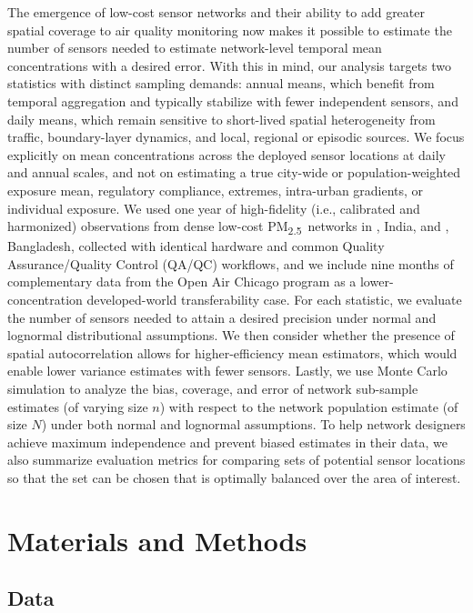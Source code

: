 \documentclass[12pt]{article}
\theoremstyle{remark}
\newcommand{\pmtt}{\textrm{PM\textsubscript{2.5}}}
\newcommand{\city}[1]{\capitalisewords{\MakeLowercase{#1}}}
\begin{document}
The emergence of low-cost sensor networks and their ability to add greater spatial coverage to air quality monitoring now makes it possible to estimate the number of sensors needed to estimate network-level temporal mean concentrations with a desired error. With this in mind, our analysis targets two statistics with distinct sampling demands: annual means, which benefit from temporal aggregation and typically stabilize with fewer independent sensors, and daily means, which remain sensitive to short-lived spatial heterogeneity from traffic, boundary-layer dynamics, and local, regional or episodic sources. We focus explicitly on mean concentrations across the deployed sensor locations at daily and annual scales, and not on estimating a true city-wide or population-weighted exposure mean, regulatory compliance, extremes, intra-urban gradients, or individual exposure. We used one year of high-fidelity (i.e., calibrated and harmonized) observations from dense low-cost \pmtt\ networks in \city{Lucknow}, India, and \city{Dhaka}, Bangladesh, collected with identical hardware and common Quality Assurance/Quality Control (QA/QC) workflows,\supercite{tsi_bluesky_2020,madhwal_evaluation_2024,jain_hybrid_2024,zaman_comparison_2025,saeed_sustaining_2025} and we include nine months of complementary data from the Open Air Chicago program as a lower-concentration developed-world transferability case. For each statistic, we evaluate the number of sensors needed to attain a desired precision under normal and lognormal distributional assumptions. We then consider whether the presence of spatial autocorrelation allows for higher-efficiency mean estimators, which would enable lower variance estimates with fewer sensors. Lastly, we use Monte Carlo simulation to analyze the bias, coverage, and error of network sub-sample estimates (of varying size $n$) with respect to the network population estimate (of size $N$) under both normal and lognormal assumptions. To help network designers achieve maximum independence and prevent biased estimates in their data, we also summarize evaluation metrics for comparing sets of potential sensor locations so that the set can be chosen that is optimally balanced over the area of interest.

\section*{Materials and Methods} \label{sec:methods}
\setcounter{section}{2}
\subsection{Data}
\end{document}
